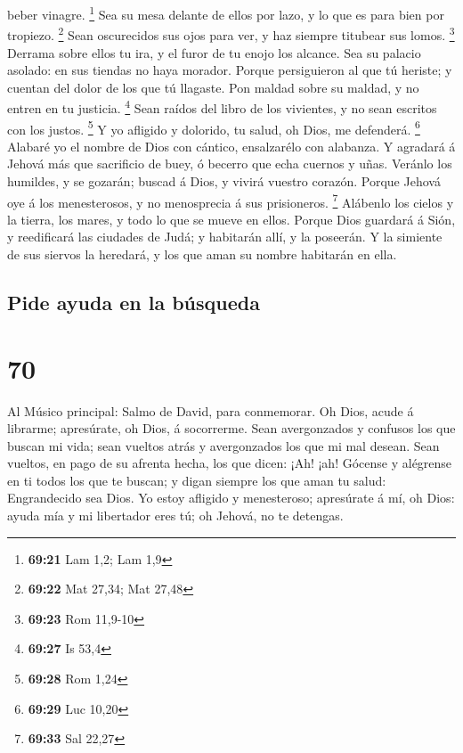 beber vinagre. \footnote{\textbf{69:21} Lam 1,2; Lam 1,9} 
Sea su mesa delante de ellos por lazo, y lo que es para bien por
tropiezo. \footnote{\textbf{69:22} Mat 27,34; Mat 27,48} 
Sean oscurecidos sus ojos para ver, y haz siempre titubear sus lomos.
\footnote{\textbf{69:23} Rom 11,9-10}  Derrama sobre ellos
tu ira, y el furor de tu enojo los alcance.  Sea su palacio
asolado: en sus tiendas no haya morador.  Porque
persiguieron al que tú heriste; y cuentan del dolor de los que tú
llagaste.  Pon maldad sobre su maldad, y no entren en tu
justicia. \footnote{\textbf{69:27} Is 53,4}  Sean raídos
del libro de los vivientes, y no sean escritos con los justos.
\footnote{\textbf{69:28} Rom 1,24}  Y yo afligido y
dolorido, tu salud, oh Dios, me defenderá. \footnote{\textbf{69:29} Luc
  10,20}  Alabaré yo el nombre de Dios con cántico,
ensalzarélo con alabanza.  Y agradará á Jehová más que
sacrificio de buey, ó becerro que echa cuernos y uñas. 
Veránlo los humildes, y se gozarán; buscad á Dios, y vivirá vuestro
corazón.  Porque Jehová oye á los menesterosos, y no
menosprecia á sus prisioneros. \footnote{\textbf{69:33} Sal 22,27}
 Alábenlo los cielos y la tierra, los mares, y todo lo que
se mueve en ellos.  Porque Dios guardará á Sión, y
reedificará las ciudades de Judá; y habitarán allí, y la poseerán.
 Y la simiente de sus siervos la heredará, y los que aman
su nombre habitarán en ella.

\hypertarget{pide-ayuda-en-la-buxfasqueda}{%
\subsection{Pide ayuda en la
búsqueda}\label{pide-ayuda-en-la-buxfasqueda}}

\hypertarget{section-69}{%
\section{70}\label{section-69}}

 Al Músico principal: Salmo de David, para conmemorar. Oh
Dios, acude á librarme; apresúrate, oh Dios, á socorrerme. 
Sean avergonzados y confusos los que buscan mi vida; sean vueltos atrás
y avergonzados los que mi mal desean.  Sean vueltos, en pago
de su afrenta hecha, los que dicen: ¡Ah! ¡ah!  Gócense y
alégrense en ti todos los que te buscan; y digan siempre los que aman tu
salud: Engrandecido sea Dios.  Yo estoy afligido y
menesteroso; apresúrate á mí, oh Dios: ayuda mía y mi libertador eres
tú; oh Jehová, no te detengas.

